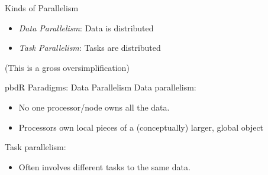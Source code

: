 
\begin{frame}
  \begin{block}{Kinds of Parallelism}\pause
    \begin{itemize}[<+-|alert@+>]
      \item \emph{Data Parallelism}:  Data is distributed
      \item \emph{Task Parallelism}:  Tasks are distributed
  \end{itemize}
  (This is a gross oversimplification)
  \end{block}
\end{frame}


\begin{frame}
  \begin{block}{pbdR Paradigms:  Data Parallelism}
  Data parallelism:
  \begin{itemize}[<+-|alert@+>]
   \item No one processor/node owns all the data.
   \item Processors own local pieces of a (conceptually) larger, global object
  \end{itemize}
  
  Task parallelism:
  \begin{itemize}
    \item Often involves different tasks to the same data.
  \end{itemize}
  \end{block}
\end{frame}


